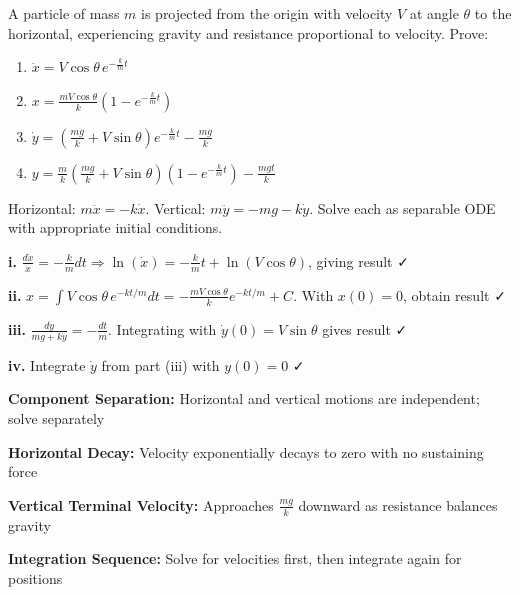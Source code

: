 \begin{problem}
A particle of mass $m$ is projected from the origin with velocity $V$ at angle $\theta$ to the horizontal, experiencing gravity and resistance proportional to velocity. Prove:
\begin{enumerate}[label=\textbf{\roman*.}]
    \item $\dot{x} = V \cos \theta \, e^{-\frac{k}{m}t}$
    \item $x = \frac{mV \cos \theta}{k} \left( 1 - e^{-\frac{k}{m}t} \right)$
    \item $\dot{y} = \left( \frac{mg}{k} + V \sin \theta \right) e^{-\frac{k}{m}t} - \frac{mg}{k}$
    \item $y = \frac{m}{k} \left( \frac{mg}{k} + V \sin \theta \right) \left( 1 - e^{-\frac{k}{m}t} \right) - \frac{mgt}{k}$
\end{enumerate}
\end{problem}

\begin{hint}
Horizontal: $m\ddot{x} = -k\dot{x}$. Vertical: $m\ddot{y} = -mg - k\dot{y}$. Solve each as separable ODE with appropriate initial conditions.
\end{hint}

\begin{solution}
\textbf{i.} $\frac{d\dot{x}}{\dot{x}} = -\frac{k}{m}dt \Rightarrow \ln(\dot{x}) = -\frac{k}{m}t + \ln(V\cos\theta)$, giving result ✓

\textbf{ii.} $x = \int V\cos\theta \, e^{-kt/m}dt = -\frac{mV\cos\theta}{k}e^{-kt/m} + C$. With $x(0)=0$, obtain result ✓

\textbf{iii.} $\frac{d\dot{y}}{mg+k\dot{y}} = -\frac{dt}{m}$. Integrating with $\dot{y}(0) = V\sin\theta$ gives result ✓

\textbf{iv.} Integrate $\dot{y}$ from part (iii) with $y(0)=0$ ✓
\end{solution}

\begin{takeaways}
\item \textbf{Component Separation:} Horizontal and vertical motions are independent; solve separately
\item \textbf{Horizontal Decay:} Velocity exponentially decays to zero with no sustaining force
\item \textbf{Vertical Terminal Velocity:} Approaches $\frac{mg}{k}$ downward as resistance balances gravity
\item \textbf{Integration Sequence:} Solve for velocities first, then integrate again for positions
\end{takeaways}

